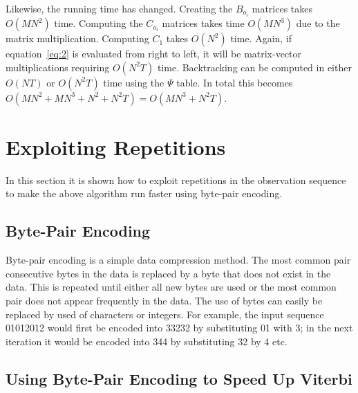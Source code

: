 Likewise, the running time has changed. Creating the $B_{o_i}$ matrices takes
$O(M N^2)$ time. Computing the $C_{o_i}$ matrices takes time $O(M N^3)$ due to
the matrix multiplication. Computing $C_1$ takes $O(N^2)$ time. Again, if
equation~\eqref{eq:2} is evaluated from right to left, it will be matrix-vector
multiplications requiring $O(N^2 T)$ time. Backtracking can be computed in either
$O(NT)$ or $O(N^2 T)$ time using the $\Psi$ table. In total this becomes
$O(M N^2 + M N^3 + N^2 + N^2 T) = O(M N^3 + N^2 T)$.

\section{Exploiting Repetitions}
\label{sec:expl-repet}

In this section it is shown how to exploit repetitions in the observation sequence
to make the above algorithm run faster using byte-pair encoding.

\subsection{Byte-Pair Encoding}

Byte-pair encoding is a simple data compression method. The most common pair
consecutive bytes in the data is replaced by a byte that does not exist in the
data. This is repeated until either all new bytes are used or the most common
pair does not appear frequently in the data. The use of bytes can easily be
replaced by used of characters or integers. For example, the input sequence
01012012 would first be encoded into 33232 by substituting 01 with 3; in the
next iteration it would be encoded into 344 by substituting 32 by 4 etc.

\subsection{Using Byte-Pair Encoding to Speed Up Viterbi}
\label{sec:using-byte-pair}

